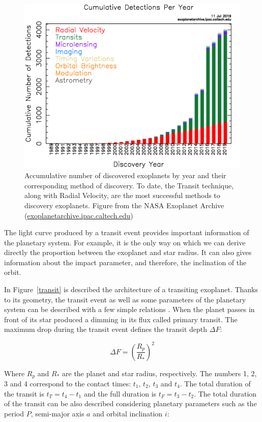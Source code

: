 \begin{figure}[ht]
\centering
\includegraphics[width=0.7\columnwidth]{imagenes/exo_dischist_cumulative.png}
\caption{Accumulative number of discovered exoplanets by year and their corresponding method of discovery. To date, the Transit technique, along with Radial Velocity, are the most successful methods to discovery exoplanets. Figure from the NASA Exoplanet Archive (\url{exoplanetarchive.ipac.caltech.edu})}
\label{amount_exoplanet}
\end{figure}

The light curve produced by a transit event provides important information of the planetary system. For example, it is the only way on which we can derive directly the proportion between the exoplanet and star radius. It can also gives information about the impact parameter, and therefore, the inclination of the orbit. 

In Figure~\ref{transit} is described the architecture of a transiting exoplanet. Thanks to its geometry, the transit event as well as some parameters of the planetary system can be described with a few simple relations \cite{Seager2003,Winn2010}.  When the planet passes in front of its star produced a dimming in its flux called primary transit. The maximum drop during the transit event defines the transit depth $\Delta{F}$:

\begin{equation}
    \Delta{F} = \left(\frac{R_{p}}{R_{*}}\right)^2 
\end{equation}

Where $R_{p}$ and $R_{*}$ are the planet and star radius, respectively. The numbers 1, 2, 3 and 4 correspond to the contact times: $t_{1}$, $t_{2}$, $t_{3}$ and $t_{4}$. The total duration of the transit is $t_{T} = t_{4}-t_{1}$ and the full duration is $t_{F}=t_{3}-t_{2}$. The total duration of the transit can be also described considering planetary parameters such as the period $P$, semi-major axis $a$ and orbital inclination $i$:

